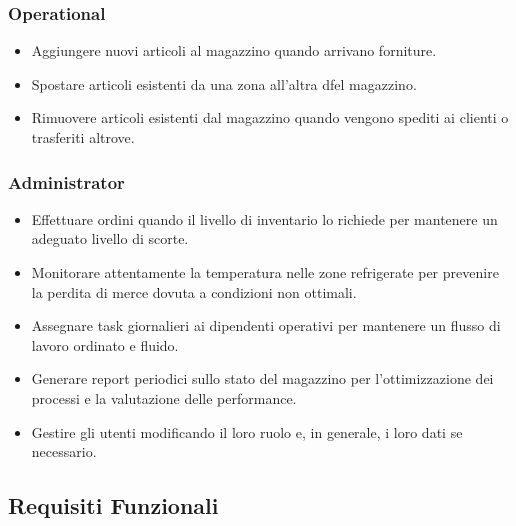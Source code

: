 \subsubsection{Operational}

\begin{itemize}
    \item Aggiungere nuovi articoli al magazzino quando arrivano forniture.
    \item Spostare articoli esistenti da una zona all'altra dfel magazzino.
    \item Rimuovere articoli esistenti dal magazzino quando vengono spediti ai clienti o trasferiti altrove.
\end{itemize}

\subsubsection{Administrator}

\begin{itemize}
    \item Effettuare ordini quando il livello di inventario lo richiede per mantenere un adeguato livello di scorte.
    \item Monitorare attentamente la temperatura nelle zone refrigerate per prevenire la perdita di merce dovuta a condizioni non ottimali.
    \item Assegnare task giornalieri ai dipendenti operativi per mantenere un flusso di lavoro ordinato e fluido.
    \item Generare report periodici sullo stato del magazzino per l'ottimizzazione dei processi e la valutazione delle performance.
    \item Gestire gli utenti modificando il loro ruolo e, in generale, i loro dati se necessario.
\end{itemize}

\subsection{Requisiti Funzionali}

